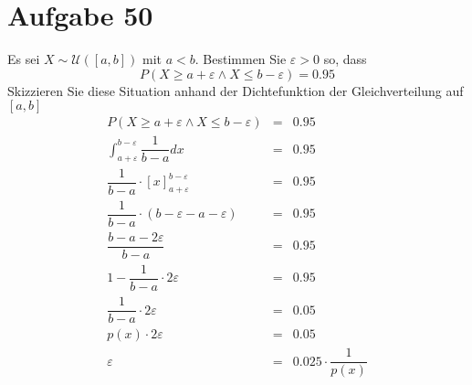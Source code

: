 \section{Aufgabe 50}
\setcounter{section}{50}

Es sei $X \sim \mathcal{U}([a, b])$ mit $a < b$. Bestimmen Sie $\varepsilon > 0$ so, dass
\begin{equation*}
    P(X \geq a + \varepsilon \land X \leq b - \varepsilon) = 0.95
\end{equation*}
Skizzieren Sie diese Situation anhand der Dichtefunktion der Gleichverteilung auf $[a, b]$
\begin{equation*}
    \begin{array}{rcl}
        P(X \geq a + \varepsilon \land X \leq b - \varepsilon) &=& 0.95 \\[10pt]
        \int_{a + \varepsilon}^{b - \varepsilon}\dfrac{1}{b - a}dx &=& 0.95 \\[10pt]
        \dfrac{1}{b - a} \cdot [x]_{a + \varepsilon}^{b - \varepsilon} &=& 0.95 \\[10pt]
        \dfrac{1}{b - a} \cdot (b - \varepsilon - a - \varepsilon) &=& 0.95 \\[10pt]
        \dfrac{b - a - 2\varepsilon}{b - a} &=& 0.95 \\[10pt]
        1 - \dfrac{1}{b - a} \cdot 2\varepsilon &=& 0.95 \\[10pt]
        \dfrac{1}{b - a} \cdot 2\varepsilon &=& 0.05 \\[10pt]
        p(x) \cdot 2\varepsilon &=& 0.05 \\[10pt]
        \varepsilon &=& 0.025 \cdot \dfrac{1}{p(x)}
    \end{array}
\end{equation*}
